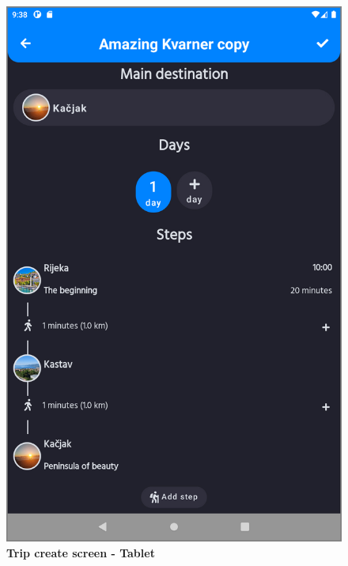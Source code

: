 \begin{figure}[!htb]
\centering
\begin{minipage}{.45\textwidth}
\centering
\includegraphics[width=.95\textwidth]{../Images/UI/TripCreateBig.jpg}
\caption{\label{fig:dbapiuser}\textbf{Trip create screen - Tablet}}
\end{minipage} 
\begin{minipage}{.45\textwidth}
\centering

\end{minipage}
\end{figure}
